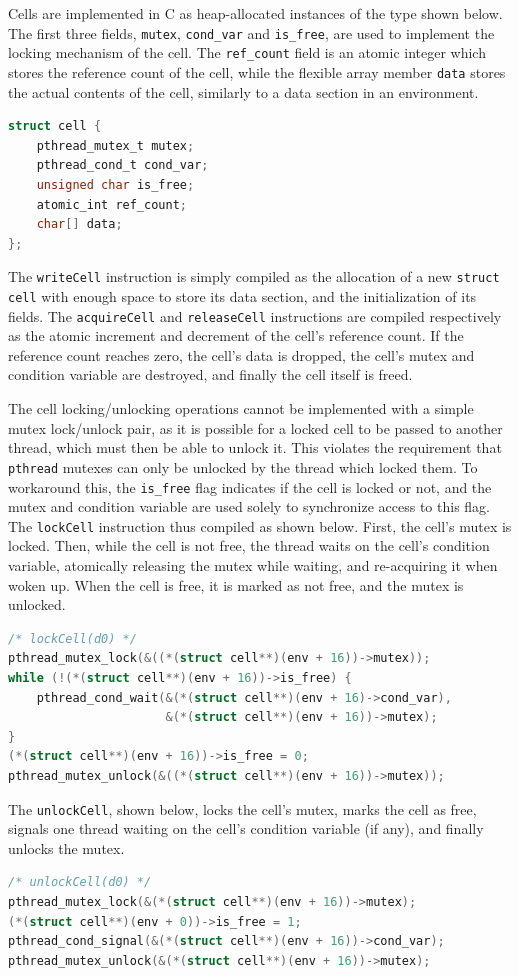 Cells are implemented in C as heap-allocated instances of the type shown below. The first three fields, \texttt{mutex}, \texttt{cond\_var} and \texttt{is\_free}, are used to implement the locking mechanism of the cell. The \texttt{ref\_count} field is an atomic integer which stores the reference count of the cell, while the flexible array member \texttt{data} stores the actual contents of the cell, similarly to a data section in an environment.

\begin{lstlisting}[language=C, frame=bottom]
struct cell {
    pthread_mutex_t mutex;
    pthread_cond_t cond_var;
    unsigned char is_free;
    atomic_int ref_count;
    char[] data;
};
\end{lstlisting}

The \texttt{writeCell} instruction is simply compiled as the allocation of a new \texttt{struct cell} with enough space to store its data section, and the initialization of its fields. The \texttt{acquireCell} and \texttt{releaseCell} instructions are compiled respectively as the atomic increment and decrement of the cell's reference count. If the reference count reaches zero, the cell's data is dropped, the cell's mutex and condition variable are destroyed, and finally the cell itself is freed.

The cell locking/unlocking operations cannot be implemented with a simple mutex lock/unlock pair, as it is possible for a locked cell to be passed to another thread, which must then be able to unlock it. This violates the requirement that \texttt{pthread} mutexes can only be unlocked by the thread which locked them. To workaround this, the \texttt{is\_free} flag indicates if the cell is locked or not, and the mutex and condition variable are used solely to synchronize access to this flag. The \texttt{lockCell} instruction thus compiled as shown below. First, the cell's mutex is locked. Then, while the cell is not free, the thread waits on the cell's condition variable, atomically releasing the mutex while waiting, and re-acquiring it when woken up. When the cell is free, it is marked as not free, and the mutex is unlocked.

\begin{lstlisting}[language=C, frame=bottom]
/* lockCell(d0) */
pthread_mutex_lock(&((*(struct cell**)(env + 16))->mutex));
while (!(*(struct cell**)(env + 16))->is_free) {
    pthread_cond_wait(&(*(struct cell**)(env + 16)->cond_var),
                      &(*(struct cell**)(env + 16))->mutex);
}
(*(struct cell**)(env + 16))->is_free = 0;
pthread_mutex_unlock(&((*(struct cell**)(env + 16))->mutex));
\end{lstlisting}

The \texttt{unlockCell}, shown below, locks the cell's mutex, marks the cell as free, signals one thread waiting on the cell's condition variable (if any), and finally unlocks the mutex.

\begin{lstlisting}[language=C, frame=bottom]
/* unlockCell(d0) */
pthread_mutex_lock(&(*(struct cell**)(env + 16))->mutex);
(*(struct cell**)(env + 0))->is_free = 1;
pthread_cond_signal(&(*(struct cell**)(env + 16))->cond_var);
pthread_mutex_unlock(&(*(struct cell**)(env + 16))->mutex);
\end{lstlisting}
